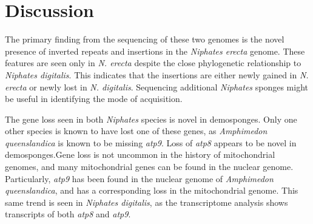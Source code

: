 \documentclass[../main.tex]{subfiles}
\begin{document}
\section{Discussion}
The primary finding from the sequencing of these two genomes is the novel presence of inverted repeats and insertions in the \emph{Niphates erecta} genome. These features are seen only in \emph{N. erecta} despite the close phylogenetic relationship to \emph{Niphates digitalis}. This indicates that the insertions are either newly gained in \emph{N. erecta} or newly lost in \emph{N. digitalis}. Sequencing additional \emph{Niphates} sponges might be useful in identifying the mode of acquisition.

The gene loss seen in both \emph{Niphates} species is novel in demosponges. Only one other species is known to have lost one of these genes, as \emph{Amphimedon queenslandica} is known to be missing \emph{atp9}. Loss of \emph{atp8} appears to be novel in demosponges.Gene loss is not uncommon in the history of mitochondrial genomes, and many mitochondrial genes can be found in the nuclear genome. Particularly, \emph{atp9} has been found in the nuclear genome of \emph{Amphimedon queenslandica}, and has a corresponding loss in the mitochondrial genome. This same trend is seen in \emph{Niphates digitalis}, as the transcriptome analysis shows transcripts of both \emph{atp8} and \emph{atp9}.
\end{document}
